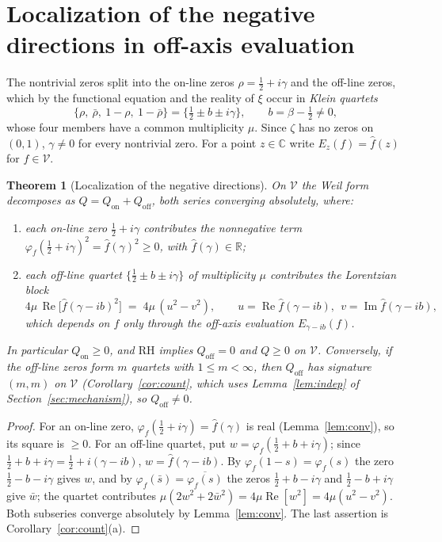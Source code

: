 \documentclass[11pt]{amsart}
\newtheorem{theorem}{Theorem}[section]
\theoremstyle{definition}
\theoremstyle{remark}
\newcommand{\RH}{\mathrm{RH}}
\renewcommand{\Re}{\operatorname{Re}}
\renewcommand{\Im}{\operatorname{Im}}
\newcommand{\half}{\tfrac12}
\newcommand{\fhat}{\widehat f}
\begin{document}
\section{Localization of the negative directions in off-axis evaluation}\label{sec:localization}

The nontrivial zeros split into the on-line zeros $\rho=\half+i\gamma$ and the off-line
zeros, which by the functional equation and the reality of $\xi$ occur in \emph{Klein quartets}
\[
\{\rho,\ \bar\rho,\ 1-\rho,\ 1-\bar\rho\}=\{\tfrac12\pm b\pm i\gamma\},\qquad
b=\beta-\tfrac12\neq0 ,
\]
whose four members have a common multiplicity $\mu$. Since $\zeta$ has no zeros on $(0,1)$,
$\gamma\neq0$ for every nontrivial zero. For a point $z\in\mathbb C$ write
$E_z(f)=\fhat(z)$ for $f\in\mathcal V$.

\begin{theorem}[Localization of the negative directions]\label{thm:loc}
On $\mathcal V$ the Weil form decomposes as $Q=Q_{\mathrm{on}}+Q_{\mathrm{off}}$, both series
converging absolutely, where:
\begin{enumerate}
\item each on-line zero $\half+i\gamma$ contributes the nonnegative term
$\varphi_f(\half+i\gamma)^2=\fhat(\gamma)^2\ge0$, with $\fhat(\gamma)\in\mathbb R$;
\item each off-line quartet $\{\half\pm b\pm i\gamma\}$ of multiplicity $\mu$ contributes the
Lorentzian block
\[
4\mu\,\Re\!\big[\fhat(\gamma-ib)^2\big]\;=\;4\mu\,(u^2-v^2),\qquad
u=\Re\fhat(\gamma-ib),\ \ v=\Im\fhat(\gamma-ib),
\]
which depends on $f$ only through the off-axis evaluation $E_{\gamma-ib}(f)$.
\end{enumerate}
In particular $Q_{\mathrm{on}}\ge0$, and $\RH$ implies $Q_{\mathrm{off}}=0$ and $Q\ge0$ on
$\mathcal V$. Conversely, if the off-line zeros form $m$ quartets with $1\le m<\infty$, then
$Q_{\mathrm{off}}$ has signature $(m,m)$ on $\mathcal V$ \textnormal{(}Corollary~\ref{cor:count},
which uses Lemma~\ref{lem:indep} of Section~\ref{sec:mechanism}\textnormal{)}, so
$Q_{\mathrm{off}}\neq0$.
\end{theorem}
\begin{proof}
For an on-line zero, $\varphi_f(\half+i\gamma)=\fhat(\gamma)$ is real (Lemma~\ref{lem:conv}),
so its square is $\ge0$. For an off-line quartet, put $w=\varphi_f(\half+b+i\gamma)$; since
$\half+b+i\gamma=\half+i(\gamma-ib)$, $w=\fhat(\gamma-ib)$. By $\varphi_f(1-s)=\varphi_f(s)$ the
zero $\half-b-i\gamma$ gives $w$, and by $\varphi_f(\bar s)=\overline{\varphi_f(s)}$ the zeros
$\half+b-i\gamma$ and $\half-b+i\gamma$ give $\bar w$; the quartet contributes
$\mu(2w^2+2\bar w^2)=4\mu\Re[w^2]=4\mu(u^2-v^2)$. Both subseries converge absolutely by
Lemma~\ref{lem:conv}. The last assertion is Corollary~\ref{cor:count}(a).
\end{proof}
\end{document}
